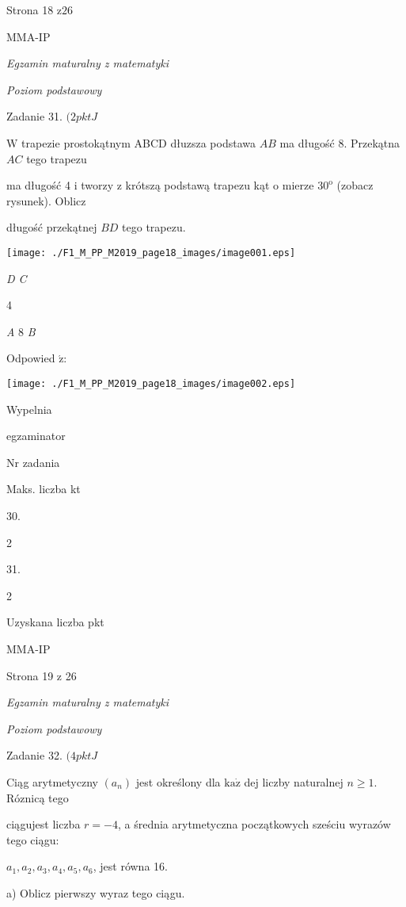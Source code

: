 \documentclass[a4paper,12pt]{article}
\begin{document}
Strona 18 $\mathrm{z}26$

MMA-IP





{\it Egzamin maturalny z matematyki}

{\it Poziom podstawowy}

Zadanie 31. $(2pktJ$

$\mathrm{W}$ trapezie prostokątnym ABCD dłuzsza podstawa $AB$ ma długość 8. Przekątna $AC$ tego trapezu

ma długość 4 i tworzy z krótszą podstawą trapezu kąt o mierze $30^{\mathrm{o}}$ (zobacz rysunek). Oblicz

długość przekątnej $BD$ tego trapezu.
\begin{center}
\texttt{[image: ./F1\_M\_PP\_M2019\_page18\_images/image001.eps]}
\end{center}
{\it D  C}

4

{\it A}  8  {\it B}

Odpowied $\acute{\mathrm{z}}$:
\begin{center}
\texttt{[image: ./F1\_M\_PP\_M2019\_page18\_images/image002.eps]}
\end{center}
Wypelnia

egzaminator

Nr zadania

Maks. liczba kt

30.

2

31.

2

Uzyskana liczba pkt

MMA-IP

Strona 19 z 26





{\it Egzamin maturalny z matematyki}

{\it Poziom podstawowy}

Zadanie 32. $(4pktJ$

Ciąg arytmetyczny $(a_{n})$ jest określony dla $\mathrm{k}\mathrm{a}\dot{\mathrm{z}}$ dej liczby naturalnej $n\geq 1$. Róznicą tego

ciągujest liczba $r=-4$, a średnia arytmetyczna początkowych sześciu wyrazów tego ciągu:

$a_{1}, a_{2}, a_{3}, a_{4}, a_{5}, a_{6}$, jest równa 16.

a) Oblicz pierwszy wyraz tego ciągu.
\end{document}
